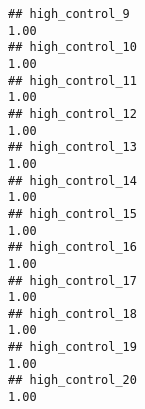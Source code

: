\documentclass[
]{article}
\begin{document}
\begin{verbatim}
## high_control_9                                                                                                                                                                                                                1.00
## high_control_10                                                                                                                                                                                                               1.00
## high_control_11                                                                                                                                                                                                               1.00
## high_control_12                                                                                                                                                                                                               1.00
## high_control_13                                                                                                                                                                                                               1.00
## high_control_14                                                                                                                                                                                                               1.00
## high_control_15                                                                                                                                                                                                               1.00
## high_control_16                                                                                                                                                                                                               1.00
## high_control_17                                                                                                                                                                                                               1.00
## high_control_18                                                                                                                                                                                                               1.00
## high_control_19                                                                                                                                                                                                               1.00
## high_control_20                                                                                                                                                                                                               1.00

\end{verbatim}
\end{document}
